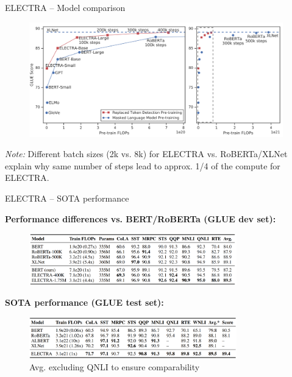 \begin{frame}{ELECTRA -- Model comparison}
	
\vfill

	\begin{figure}
		\centering
		\includegraphics[width = 11cm]{figure/61-electra-glue.png}\\ 
	\end{figure}
	
{\footnotesize \textit{Note:} Different batch sizes (2k vs. 8k) for ELECTRA vs. RoBERTa/XLNet explain why same number of steps lead to approx. 1/4 of the compute for ELECTRA.}

\vfill

\end{frame}


\begin{frame}{ELECTRA -- SOTA performance}

\vfill

	\textbf{Performance differences vs. BERT/RoBERTa (GLUE dev set):}

	\begin{figure}
		\centering
		\includegraphics[width = 9cm]{figure/61-electra-sota1.png}\\ 
	\end{figure}

	\textbf{SOTA performance (GLUE test set):}

	\begin{figure}
		\centering
		\includegraphics[width = 9cm]{figure/61-electra-sota2.png}\\ 
		{\tiny * Avg. excluding QNLI to ensure comparability}\\
	\end{figure}
	
\vfill

\end{frame}

